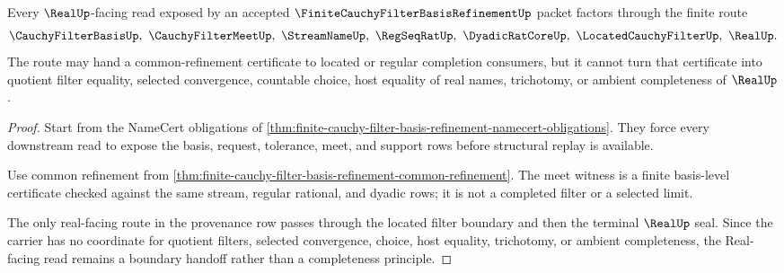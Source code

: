 \begin{theorem}
\label{thm:finite-cauchy-filter-basis-refinement-real-seal-boundary}
Every $\RealUp$-facing read exposed by an accepted $\FiniteCauchyFilterBasisRefinementUp$ packet factors through the finite route
$$
\CauchyFilterBasisUp,\ \CauchyFilterMeetUp,\ \StreamNameUp,\ \RegSeqRatUp,\ \DyadicRatCoreUp,\ \LocatedCauchyFilterUp,\ \RealUp .
$$
The route may hand a common-refinement certificate to located or regular completion consumers, but it cannot turn that certificate into quotient filter equality, selected convergence, countable choice, host equality of real names, trichotomy, or ambient completeness of $\RealUp$.
\end{theorem}
\begin{proof}
Start from the NameCert obligations of \autoref{thm:finite-cauchy-filter-basis-refinement-namecert-obligations}. They force every downstream read to expose the basis, request, tolerance, meet, and support rows before structural replay is available.

Use common refinement from \autoref{thm:finite-cauchy-filter-basis-refinement-common-refinement}. The meet witness is a finite basis-level certificate checked against the same stream, regular rational, and dyadic rows; it is not a completed filter or a selected limit.

The only real-facing route in the provenance row passes through the located filter boundary and then the terminal $\RealUp$ seal. Since the carrier has no coordinate for quotient filters, selected convergence, choice, host equality, trichotomy, or ambient completeness, the Real-facing read remains a boundary handoff rather than a completeness principle.
\end{proof}



